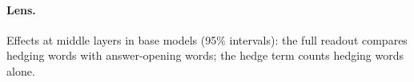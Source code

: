 \documentclass[11pt]{article}
\begin{document}
\paragraph{Lens.} Effects at middle layers in base models (95\% intervals): the full readout compares hedging words with answer-opening words; the hedge term counts hedging words alone.

\begin{table}[h]
\centering
\scriptsize\setlength{\tabcolsep}{2pt}
\caption{Lens effects in base models. Lenses are fitted per model, so compare within a model.}
\label{tab:lens}
\end{table}
\end{document}
